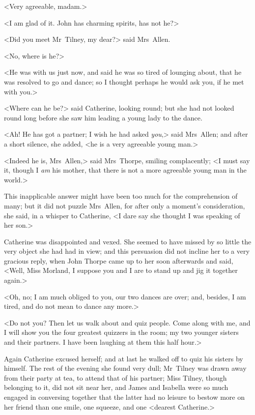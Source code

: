  <Very agreeable, madam.> 

 <I am glad of it. John has charming spirits, has not he?> 

 <Did you meet Mr~Tilney, my dear?> said Mrs~Allen. 

 <No, where is he?> 

 <He was with us just now, and said he was so tired of lounging about, that he was resolved to go and dance; so I thought perhaps he would ask you, if he met with you.> 

 <Where can he be?> said Catherine, looking round; but she had not looked round long before she saw him leading a young lady to the dance. 

 <Ah! He has got a partner; I wish he had asked \textit{you},> said Mrs~Allen; and after a short silence, she added, <he is a very agreeable young man.> 

 <Indeed he is, Mrs~Allen,> said Mrs~Thorpe, smiling complacently; <I must say it, though I \textit{am} his mother, that there is not a more agreeable young man in the world.> 

 This inapplicable answer might have been too much for the comprehension of many; but it did not puzzle Mrs~Allen, for after only a moment's consideration, she said, in a whisper to Catherine, <I dare say she thought I was speaking of her son.> 

 Catherine was disappointed and vexed. She seemed to have missed by so little the very object she had had in view; and this persuasion did not incline her to a very gracious reply, when John Thorpe came up to her soon afterwards and said, <Well, Miss Morland, I suppose you and I are to stand up and jig it together again.> 

 <Oh, no; I am much obliged to you, our two dances are over; and, besides, I am tired, and do not mean to dance any more.> 

 <Do not you? Then let us walk about and quiz people. Come along with me, and I will show you the four greatest quizzers in the room; my two younger sisters and their partners. I have been laughing at them this half hour.> 

 Again Catherine excused herself; and at last he walked off to quiz his sisters by himself. The rest of the evening she found very dull; Mr~Tilney was drawn away from their party at tea, to attend that of his partner; Miss Tilney, though belonging to it, did not sit near her, and James and Isabella were so much engaged in conversing together that the latter had no leisure to bestow more on her friend than one smile, one squeeze, and one <dearest Catherine.> 